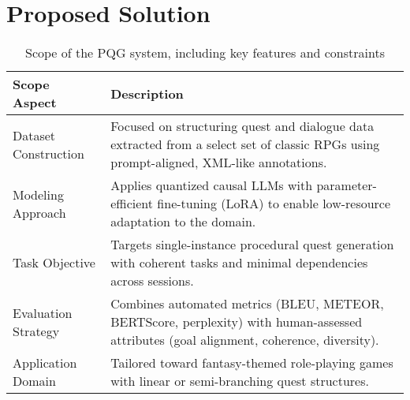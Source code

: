 \section{Proposed Solution}

\begin{table}[t]
  \centering
  \scriptsize
  \renewcommand{\arraystretch}{1.3}
  \begin{tabularx}{0.95\textwidth}{
    >{\raggedright\arraybackslash}p{5cm}
    >{\raggedright\arraybackslash}X
  }
    \toprule
    \textbf{Scope Aspect} & \textbf{Description} \\
    \midrule
    Dataset Construction
      & Focused on structuring quest and dialogue data extracted from a select set of classic RPGs using prompt-aligned, XML-like annotations. \\
    Modeling Approach
      & Applies quantized causal LLMs with parameter-efficient fine-tuning (LoRA) to enable low-resource adaptation to the domain. \\
    Task Objective
      & Targets single-instance procedural quest generation with coherent tasks and minimal dependencies across sessions. \\
    Evaluation Strategy
      & Combines automated metrics (BLEU, METEOR, BERTScore, perplexity) with human-assessed attributes (goal alignment, coherence, diversity). \\
    Application Domain
      & Tailored toward fantasy-themed role-playing games with linear or semi-branching quest structures. \\
    \bottomrule
  \end{tabularx}
  \caption{Scope of the PQG system, including key features and constraints}
  \label{table:scope}
\end{table}

